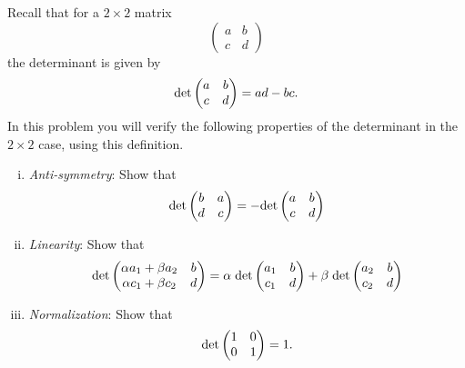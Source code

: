 \begin{question}	\normalfont
	Recall that for a $2\times 2$ matrix 
	\[
	\begin{pmatrix}
			a & b \\
			c & d
		\end{pmatrix}
\]
the determinant is given by
\[
\textup{det} \begin{pmatrix}
			a & b \\
			c & d
		\end{pmatrix} = ad - bc. 
\]
In this problem you will verify the following properties of the determinant in the $2\times 2$ case, using this definition. 

\begin{enumerate}[(i)]

\item \emph{Anti-symmetry}: Show that 
\[
\textup{det}\begin{pmatrix}
			b & a \\
			d & c
		\end{pmatrix} = - \textup{det}\begin{pmatrix}
			a & b \\
			c & d
		\end{pmatrix} 
\]
\item \emph{Linearity}: Show that 
\[
\textup{det}\begin{pmatrix}
			\alpha a_1 + \beta a_2 & b \\
			\alpha c_1 + \beta c_2 & d
		\end{pmatrix} = \alpha \hspace{.1cm} \textup{det}\begin{pmatrix}
			a_1 & b \\
			c_1 & d
		\end{pmatrix} + \beta  \hspace{.1cm}  \textup{det}\begin{pmatrix}
			a_2 & b \\
			c_2 & d
		\end{pmatrix}  
\]

\item \emph{Normalization}: Show that 
\[
\textup{det}\begin{pmatrix}
			1 & 0 \\
			0 & 1
		\end{pmatrix} = 1.
\]

\end{enumerate}

\end{question}

